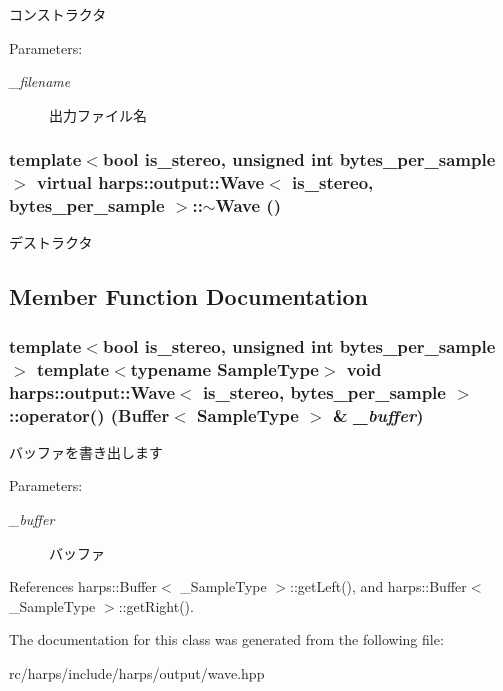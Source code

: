 コンストラクタ \begin{Desc}
\item[Parameters:]
\begin{description}
\item[{\em \_\-filename}]出力ファイル名 \end{description}
\end{Desc}
\subsubsection[$\sim$Wave]{\setlength{\rightskip}{0pt plus 5cm}template$<$bool is\_\-stereo, unsigned int bytes\_\-per\_\-sample$>$ virtual {\bf harps::output::Wave}$<$ is\_\-stereo, bytes\_\-per\_\-sample $>$::$\sim${\bf Wave} ()\hspace{0.3cm}{\tt  [inline, virtual]}}\label{classharps_1_1output_1_1Wave_05c145cb74ff699e183a516a76f9a50a}


デストラクタ 

\subsection{Member Function Documentation}
\subsubsection[operator()]{\setlength{\rightskip}{0pt plus 5cm}template$<$bool is\_\-stereo, unsigned int bytes\_\-per\_\-sample$>$ template$<$typename SampleType$>$ void {\bf harps::output::Wave}$<$ is\_\-stereo, bytes\_\-per\_\-sample $>$::operator() ({\bf Buffer}$<$ SampleType $>$ \& {\em \_\-buffer})\hspace{0.3cm}{\tt  [inline]}}\label{classharps_1_1output_1_1Wave_88399ca38037a5aa11bd8daa73d91cfa}


バッファを書き出します \begin{Desc}
\item[Parameters:]
\begin{description}
\item[{\em \_\-buffer}]バッファ \end{description}
\end{Desc}


References harps::Buffer$<$ \_\-SampleType $>$::getLeft(), and harps::Buffer$<$ \_\-SampleType $>$::getRight().

The documentation for this class was generated from the following file:\begin{CompactItemize}
\item 
rc/harps/include/harps/output/wave.hpp\end{CompactItemize}
